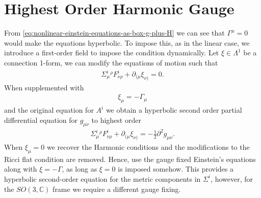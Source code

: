 \documentclass[10pt]{report}
\theoremstyle{definition}
\newcommand{\C}[0]{\mathbb{C}}
\begin{document}
        \section{Highest Order Harmonic Gauge} \label{sec:nonlin-harmonic-gauge}
        From \cref{eq:nonlinear-einstein-equations-as-box-g-plus-H} we can see that $\Gamma^\mu = 0$ would make the equations hyperbolic. To impose this, as in the linear case, we introduce a first-order field to impose the condition dynamically. Let $\xi \in \Lambda^1$ be a connection 1-form, we can modify the equations of motion such that 
        \begin{align}
            \Sigma^i_\mu{}^\rho F^i_{\nu\rho} + \partial_{(\mu} \xi_{\nu)} = 0 \label{eq:nonlinear-modified-einsteins-conditions-on-connections}.
        \end{align}
        When supplemented with 
        \begin{align}
            \xi_\mu = - \Gamma_\mu
        \end{align}
        and the original equation for $A^i$ we obtain a hyperbolic second order partial differential equation for $g_{\mu\nu}$ to highest order
        \begin{align}
            \Sigma^i_\mu{}^\rho F^i_{\nu\rho} + \partial_{(\mu} \xi_{\nu)} = -\frac{1}{2} \partial^2 g_{\mu\nu}.
        \end{align}
        When $\xi_\mu = 0$ we recover the Harmonic conditions and the modifications to the Ricci flat condition are removed. Hence, use the gauge fixed Einstein's equations along with $\xi = - \Gamma$, as long as $\xi = 0$ is imposed somehow. This provides a hyperbolic second-order equation for the metric components in $\Sigma^i$, however, for the $SO(3,\C)$ frame we require a different gauge fixing.
        
\end{document}
